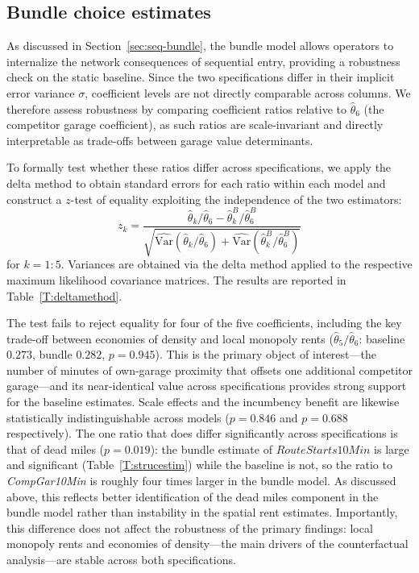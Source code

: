 \documentclass[12pt]{article}
\begin{document}
\subsection{Bundle choice estimates}\label{sec:bundle-results}
As discussed in Section~\ref{sec:seq-bundle}, the bundle model allows 
operators to internalize the network consequences of sequential entry, 
providing a robustness check on the static baseline. Since the two 
specifications differ in their implicit error variance $\sigma$, coefficient 
levels are not directly comparable across columns. We therefore assess 
robustness by comparing coefficient ratios relative to $\hat{\theta}_6$ 
(the competitor garage coefficient), as such ratios are scale-invariant and directly 
interpretable as trade-offs between garage value determinants.

To formally test whether these ratios differ across specifications, we apply 
the delta method to obtain standard errors  \citep{greene2012econometric} for each ratio within each model 
and construct a $z$-test of equality exploiting the independence of the two 
estimators:
\begin{equation}\label{eq:deltamethod}
z_k = \frac{\hat{\theta}_k/\hat{\theta}_6 - \hat{\theta}_k^B/\hat{\theta}_6^B}
{\sqrt{\widehat{\text{Var}}(\hat{\theta}_k/\hat{\theta}_6) + 
\widehat{\text{Var}}(\hat{\theta}_k^B/\hat{\theta}_6^B)}}
\end{equation}
for $k=1:5$. Variances are obtained via the delta method applied to the respective 
maximum likelihood covariance matrices. The results are reported in 
Table~\ref{T:deltamethod}.

The test fails to reject equality for four of the five coefficients, 
including the key trade-off between economies of density and local monopoly 
rents ($\hat{\theta}_5/\hat{\theta}_6$: baseline $0.273$, bundle $0.282$, 
$p=0.945$). This is the primary object of interest---the number of minutes 
of own-garage proximity that offsets one additional competitor garage---and 
its near-identical value across specifications provides strong support for 
the baseline estimates. Scale effects and the incumbency benefit are likewise 
statistically indistinguishable across models ($p=0.846$ and $p=0.688$ 
respectively). The one ratio that does differ significantly across 
specifications is that of dead miles ($p=0.019$): the bundle estimate of 
$\textit{RouteStarts10Min}$ is large and significant (Table~\ref{T:strucestim}) 
while the baseline is not, so the ratio to \textit{CompGar10Min} is roughly 
four times larger in the bundle model. As discussed above, this reflects 
better identification of the dead miles component in the bundle model rather 
than instability in the spatial rent estimates. Importantly, this difference 
does not affect the robustness of the primary findings: local monopoly rents 
and economies of density---the main drivers of the counterfactual analysis---are stable across both specifications.
\end{document}
